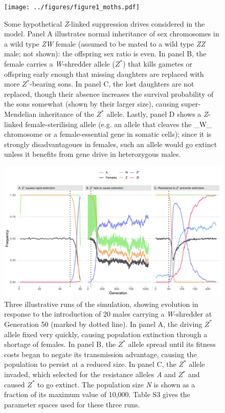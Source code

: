 \documentclass[]{rsos}%
\begin{document}
\begin{figure}[h]
\centering
\texttt{[image: ../figures/figure1\_moths.pdf]}
\caption{\footnotesize{Some hypothetical \textit{Z}-linked suppression drives considered in the model. Panel A illustrates normal inheritance of sex chromosomes in a wild type \textit{ZW} female (assumed to be mated to a wild type \textit{ZZ} male; not shown): the offspring sex ratio is even. In panel B, the female carries a \textit{W}-shredder allele ($Z^*$) that kills gametes or offspring early enough that missing daughters are replaced with more $Z^*$-bearing sons. In panel C, the lost daughters are not replaced, though their absence increases the survival probability of the sons somewhat (shown by their larger size), causing super-Mendelian inheritance of the $Z^*$ allele. Lastly, panel D shows a \textit{Z}-linked female-sterilising allele (e.g. an allele that cleaves the _W_ chromosome or a female-essential gene in somatic cells); since it is strongly disadvantagoues in females, such an allele would go extinct unless it benefits from gene drive in heterozygous males.}}
\end{figure}
\newpage

\begin{figure}[h]
\centering
\includegraphics[width=1.0\textwidth]{../figures/figure1.pdf}
\caption{\footnotesize{Three illustrative runs of the simulation, showing evolution in response to the introduction of 20 males carrying a \textit{W}-shredder at Generation 50 (marked by dotted line). In panel A, the driving $Z^*$ allele fixed very quickly, causing population extinction through a shortage of females. In panel B, the $Z^*$ allele spread until its fitness costs began to negate its transmission advantage, causing the population to persist at a reduced size. In panel C, the $Z^*$ allele invaded, which selected for the resistance alleles \textit{A} and $Z^r$ and caused $Z^*$ to go extinct. The population size \textit{N} is shown as a fraction of its maximum value of 10,000. Table S3 gives the parameter spaces used for these three runs.}}
\end{figure}
\newpage
\end{document}
